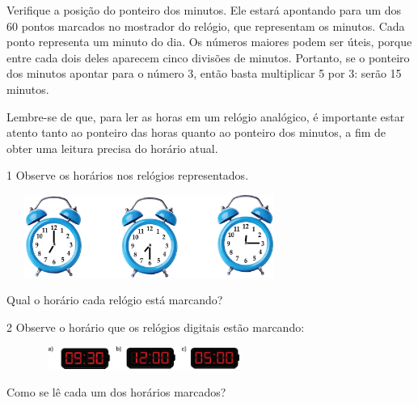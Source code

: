 \begin{multicols}{2}
{Verifique a posição do ponteiro dos minutos. Ele estará apontando para um dos 60 pontos marcados no mostrador do relógio, que representam os minutos. Cada ponto representa um minuto do dia. Os números maiores podem ser úteis, porque entre cada dois deles aparecem cinco divisões de minutos. Portanto, se o ponteiro dos minutos apontar para o número 3, então basta multiplicar 5 por 3: serão 15 minutos.

Lembre-se de que, para ler as horas em um relógio analógico, é importante estar atento tanto ao ponteiro das horas quanto ao ponteiro dos minutos, a fim de obter uma leitura precisa do horário atual.}


\num{1} Observe os horários nos relógios representados.


\includegraphics[width=3.66698in,height=1.05843in]{media/image51.png}

Qual o horário cada relógio está marcando?


\num{2} Observe o horário que os relógios digitais estão marcando:


\includegraphics[width=3.54197in,height=0.29169in]{media/image52.png}

Como se lê cada um dos horários marcados?



\end{multicols}
